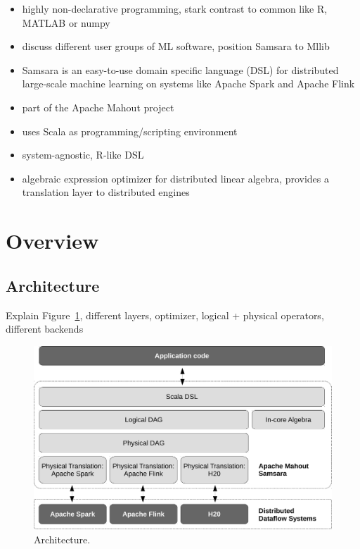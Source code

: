 \documentclass{article}
\begin{document}
\begin{itemize}[noitemsep]
  \item highly non-declarative programming, stark contrast to common like R, MATLAB or numpy
  \item discuss different user groups of ML software, position Samsara to Mllib
\end{itemize}

\begin{itemize}[noitemsep]  
  \item Samsara is an easy-to-use domain specific language (DSL) for distributed large-scale machine learning on systems like Apache Spark and Apache Flink
  \item part of the Apache Mahout project
  \item uses Scala as programming/scripting environment
  \item system-agnostic, R-like DSL
  \item algebraic expression optimizer for distributed linear algebra, provides a translation layer to distributed engines
\end{itemize}

\section{Overview}

\subsection{Architecture}


Explain Figure~\ref{fig:architecture}, different layers, optimizer, logical + physical operators, different backends

\begin{figure}
  \centering
  \includegraphics[scale=.5]{figures/architecture-crop}
  \caption{Architecture.}
  \label{fig:architecture}
\end{figure}
\end{document}
